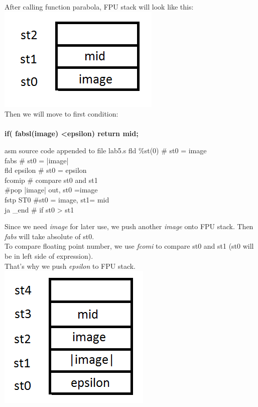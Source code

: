 \documentclass{article}
\begin{document}
\begin{multicols}{2}
After calling function parabola, FPU stack will look like this: \\
\includegraphics[scale=0.5]{stack2.png} \\
Then we will move to first condition: \\ \\ \textbf{if( fabsl(image) \textless epsilon) return mid;}
\begin{GFT}{asm source code appended to file lab5.s}
\+fld \%st(0)		\# st0 = image	\\
\+fabs			\# st0 = |image|\\
\+fld epsilon		\# st0 = epsilon\\
\+fcomip			\# compare st0 and st1\\
\+\#pop |image| out, st0 =image\\
\+fstp ST0		\#st0 = image, st1= mid\\
\+ja \_end			\# if st0 > st1\\
\end{GFT}
Since we need \textit{image} for later use, we push another \textit{image} onto FPU stack. Then \textit{fabs} will take absolute of st0.\\
To compare floating point number, we use \textit{fcomi} to compare st0 and st1 (st0 will be in left side of expression). \\
\columnbreak
 That's why we push \textit{epsilon} to FPU stack. \\
\includegraphics[scale=0.5]{stack3.png} \\

\end{multicols}
\end{document}
